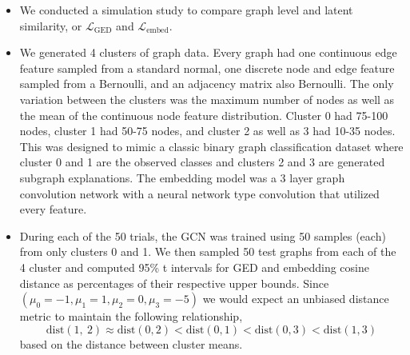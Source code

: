 \documentclass[
  11pt,
  letterpaper,
]{article}
\begin{document}
\begin{itemize}
\item
  We conducted a simulation study to compare graph level and latent
  similarity, or \(\mathcal{L}_{\text{GED}}\) and
  \(\mathcal{L}_{\text{embed}}\).
\item
  We generated 4 clusters of graph data. Every graph had one continuous
  edge feature sampled from a standard normal, one discrete node and
  edge feature sampled from a Bernoulli, and an adjacency matrix also
  Bernoulli. The only variation between the clusters was the maximum
  number of nodes as well as the mean of the continuous node feature
  distribution. Cluster 0 had 75-100 nodes, cluster 1 had 50-75 nodes,
  and cluster 2 as well as 3 had 10-35 nodes. This was designed to mimic
  a classic binary graph classification dataset where cluster 0 and 1
  are the observed classes and clusters 2 and 3 are generated subgraph
  explanations. The embedding model was a 3 layer graph convolution
  network with a neural network type convolution that utilized every
  feature.
\item
  During each of the 50 trials, the GCN was trained using 50 samples
  (each) from only clusters 0 and 1. We then sampled 50 test graphs from
  each of the 4 cluster and computed 95\% t intervals for GED and
  embedding cosine distance as percentages of their respective upper
  bounds. Since \((\mu_0 = -1, \mu_1 = 1, \mu_2 = 0, \mu_3 = -5)\) we
  would expect an unbiased distance metric to maintain the following
  relationship, \begin{equation}
    \text{dist}(1,\ 2) \approx \text{dist}(0, 2) < \text{dist}(0, 1) < \text{dist}(0, 3) < \text{dist}(1, 3)
  \end{equation} based on the distance between cluster means.
\end{itemize}
\end{document}
